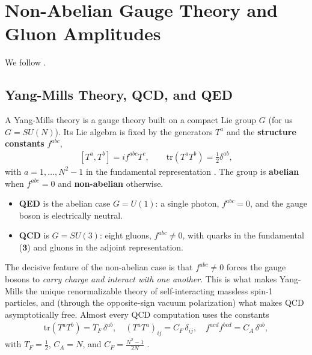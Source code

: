 \section{Non-Abelian Gauge Theory and Gluon Amplitudes}
\label{sec:qcd}

We follow \autocite[Chapters~25--27]{schwartzQFT2014}.

\subsection{Yang-Mills Theory, QCD, and QED}
\label{sec:yang-mills-qcd-qed}

A Yang-Mills theory is a gauge theory built on a compact Lie group $G$ (for us $G = SU(N)$). Its Lie algebra is fixed by the generators $T^a$ and the \textbf{structure constants} $f^{abc}$,
\begin{align}
    \label{eq:lie-algebra}
    [T^a, T^b] = i f^{abc} T^c,
    \qquad
    \mathrm{tr}(T^a T^b) = \tfrac{1}{2}\delta^{ab},
\end{align}
with $a = 1, \ldots, N^2 - 1$ in the fundamental representation \autocite[(25.8),(25.19)]{schwartzQFT2014}. The group is \textbf{abelian} when $f^{abc} = 0$ and \textbf{non-abelian} otherwise.

\begin{itemize}
    \item \textbf{QED} is the abelian case $G = U(1)$: a single photon, $f^{abc} = 0$, and the gauge boson is electrically neutral.
    \item \textbf{QCD} is $G = SU(3)$: eight gluons, $f^{abc} \neq 0$, with quarks in the fundamental ($\mathbf{3}$) and gluons in the adjoint representation.
\end{itemize}

The decisive feature of the non-abelian case is that $f^{abc}\neq 0$ forces the gauge bosons to \emph{carry charge and interact with one another}. This is what makes Yang-Mills the unique renormalizable theory of self-interacting massless spin-1 particles, and (through the opposite-sign vacuum polarization) what makes QCD asymptotically free. Almost every QCD computation uses the constants
\begin{align}
    \mathrm{tr}(T^a T^b) = T_F\,\delta^{ab},
    \quad
    (T^a T^a)_{ij} = C_F\,\delta_{ij},
    \quad
    f^{acd}f^{bcd} = C_A\,\delta^{ab},
\end{align}
with $T_F = \tfrac12$, $C_A = N$, and $C_F = \tfrac{N^2-1}{2N}$ \autocite[(25.37--25.39)]{schwartzQFT2014}.


